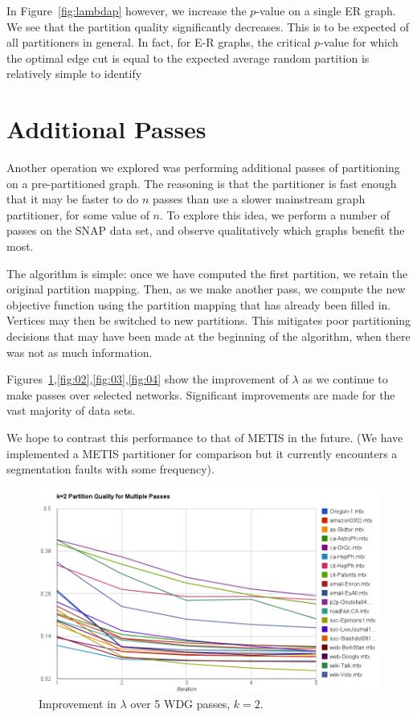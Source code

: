 In Figure~\ref{fig:lambdap} however, we increase the $p$-value on a single ER graph. We see that the partition quality significantly decreases. This is to be expected of all partitioners in general. In fact, for E-R graphs, the critical $p$-value for which the optimal edge cut is equal to the expected average random partition is relatively simple to identify~\cite{journals/cj/GanleyH94}

\section{Additional Passes}
Another operation we explored was performing additional passes of partitioning on a pre-partitioned graph. The reasoning is that the partitioner is fast enough that it may be faster to do $n$ passes than use a slower mainstream graph partitioner, for some value of $n$. To explore this idea, we perform a number of passes on the SNAP data set, and observe qualitatively which graphs benefit the most. 

The algorithm is simple: once we have computed the first partition, we retain the original partition mapping. Then, as we make another pass, we compute the new objective function using the partition mapping that has already been filled in. Vertices may then be switched to new partitions. This mitigates poor partitioning decisions that may have been made at the beginning of the algorithm, when there was not as much information. 

Figures~\ref{fig:01},\ref{fig:02},\ref{fig:03},\ref{fig:04} show the improvement of $\lambda$ as we continue to make passes over selected networks. Significant improvements are made for the vast majority of data sets.

We hope to contrast this performance to that of METIS in the future. (We have implemented a METIS partitioner for comparison but it currently encounters a segmentation faults with some frequency). 



\begin{figure}[h!]
\centering
\includegraphics[width=0.8\columnwidth] {figures/2partlambda}
\caption[Caption for]{Improvement in $\lambda$ over 5 WDG passes, $k=2$.}
\label{fig:01}
\end{figure}

